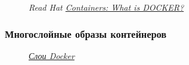\documentclass[14pt, a4paper]{article}
\begin{document}
\begin{figure}[H]
    \centering
    \caption*{\textit{Read Hat \href{https://www.redhat.com/en/topics/containers/what-is-docker}{Containers: What is DOCKER?}\\}}
    \label{3.3}
\end{figure}

\subsubsection*{Многослойные образы контейнеров}

\begin{figure}[H]
    \centering
    \caption*{\textit{\href{https://medium.com/nuances-of-programming/контейнеры-это-просто-контейнерные-технологии-для-начинающих-3912870fbc69}{Слои Docker}}}
    \label{3.4}
\end{figure}
\end{document}
